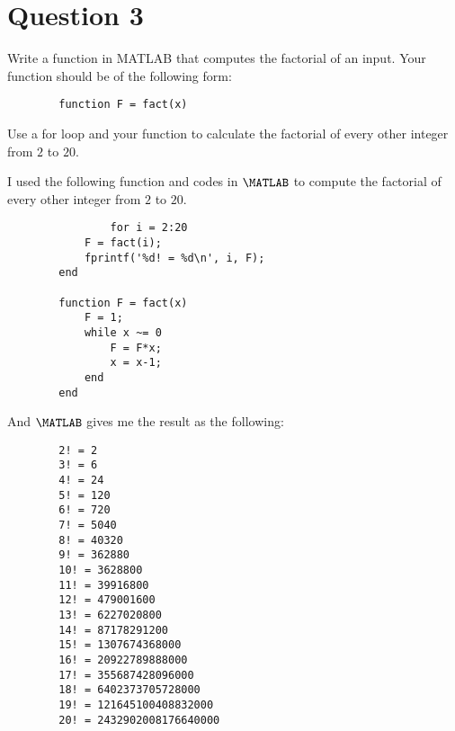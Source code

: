 \section{Question 3}

\begin{question}
    Write a function in MATLAB that computes the factorial of an input. Your function should be of the following form:
    \begin{verbatim}
        function F = fact(x)
    \end{verbatim}
    Use a for loop and your function to calculate the factorial of every other integer from $2$ to $20$.
\end{question}

\begin{answer}
    I used the following function and codes in $\MATLAB$ to compute the factorial of every other integer from $2$ to $20$.
    \begin{verbatim}
                for i = 2:20
            F = fact(i);
            fprintf('%d! = %d\n', i, F);
        end
        
        function F = fact(x)
            F = 1;
            while x ~= 0
                F = F*x;
                x = x-1;
            end
        end
    \end{verbatim}
    And $\MATLAB$ gives me the result as the following:
    \begin{verbatim}
        2! = 2
        3! = 6
        4! = 24
        5! = 120
        6! = 720
        7! = 5040
        8! = 40320
        9! = 362880
        10! = 3628800
        11! = 39916800
        12! = 479001600
        13! = 6227020800
        14! = 87178291200
        15! = 1307674368000
        16! = 20922789888000
        17! = 355687428096000
        18! = 6402373705728000
        19! = 121645100408832000
        20! = 2432902008176640000
    \end{verbatim}
\end{answer}